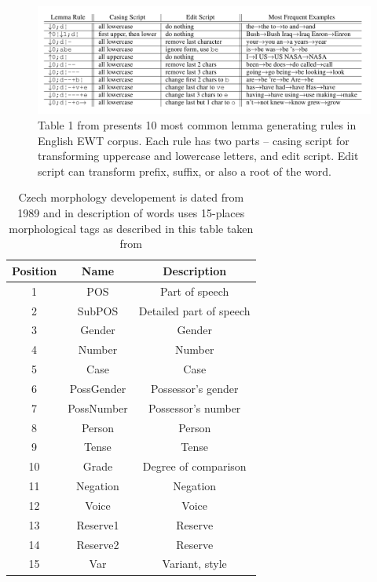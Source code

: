 \begin{figure}[H]
\centering
\includegraphics[width=1\textwidth]{../img/lemma_rules}
\protect\caption{
Table 1 from \citep{Straka2019b} presents 10 most common lemma generating rules in English EWT corpus. Each rule has two parts -- casing script for transforming uppercase and lowercase letters, and edit script. Edit script can transform prefix, suffix, or also a root of the word.
}
\label{fig:lemma_rules}
\end{figure}

\begin{table}
\centering
\label{Tab:tagset}
\begin{tabular}{ |c|c|c| } 

 \hline
 Position & Name & Description \\ 
 \hline \hline
 1 & POS & Part of speech \\ \hline
 2 & SubPOS & Detailed part of speech \\ \hline
  3 & Gender & Gender \\ \hline
4 & Number & Number \\\hline
  5 & Case & Case \\ \hline
 6 & PossGender & Possessor's gender \\\hline
  7 & PossNumber & Possessor's number \\ \hline
8 & Person & Person \\\hline
  9 & Tense & Tense \\ \hline
 10 & Grade & Degree of comparison\\\hline
  11 & Negation & Negation \\ \hline
 12 & Voice & Voice \\\hline
 13 & Reserve1 & Reserve \\ \hline
14 & Reserve2 & Reserve \\\hline
  15 & Var & Variant, style \\ 
 \hline

\end{tabular}
\caption{Czech morphology developement is dated from 1989 %
and in description of words uses 15-places morphological tags as described in this table taken from \citep{Hana2005}} 
\end{table}

